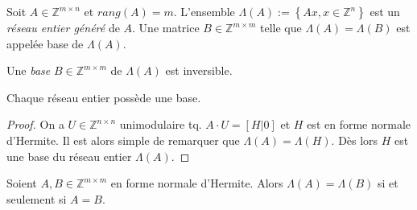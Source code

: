   \begin{definition}
    \label{def:49}
    Soit $A \in \mathbb{Z}^{m\times n}$ et  $rang(A)=m$. L'ensemble  $\Lambda(A):=\left\{ Ax,x\in \mathbb{Z}^{n} \right\}$ est  un \emph{réseau entier généré}  de $A$. Une matrice  $B \in \mathbb{Z}^{m\times m}$ telle que  $\Lambda(A)=\Lambda(B)$ est appelée base de $\Lambda(A)$. 
  \end{definition}

  \begin{remark}
    Une  \emph{base} $B ∈ ℤ^{m ×m}$  de $Λ(A)$ est inversible. 
  \end{remark}
	
 \begin{corollary}
    \label{co:9}
    Chaque réseau entier possède une base.
  \end{corollary}


  \begin{proof}
    On a $U ∈ℤ^{ n ×n}$ unimodulaire tq. $A ⋅ U = [H | 0]$ et $H$ est
    en forme normale d'Hermite. Il est alors simple de remarquer que
    $\Lambda(A)=\Lambda(H)$. Dès lors $H$ est une base du réseau
    entier $Λ(A)$.
  \end{proof}

  \begin{theorem}
    \label{thr:28}
    Soient $A,B \in \mathbb{Z}^{m\times m}$ en forme normale d'Hermite.    Alors $Λ(A) = Λ(B)$ si et seulement si $A = B$. 
  \end{theorem}

